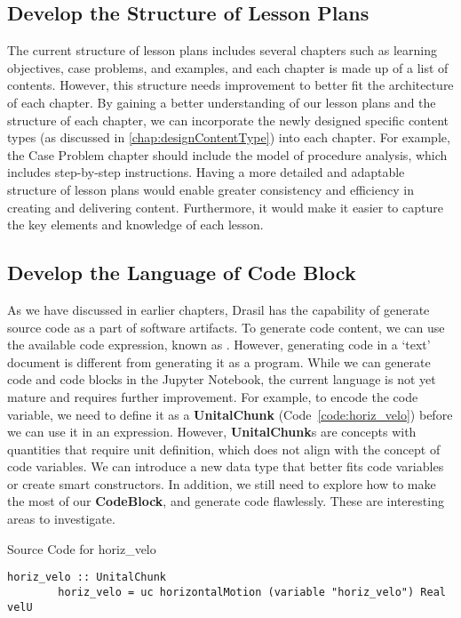 \subsection{Develop the Structure of Lesson Plans} 
\label{chap:developlsnPlanStruc}
The current structure of lesson plans includes several chapters such as 
learning objectives, case problems, and examples, and each chapter is made up 
of a list of contents. However, this structure needs improvement to better fit 
the architecture of each chapter. By gaining a better understanding of our 
lesson plans and the structure of each chapter, we can incorporate the newly 
designed specific content types (as discussed in \ref{chap:designContentType}) 
into each chapter. For example, the Case Problem chapter should include the 
model of procedure analysis, which includes step-by-step instructions. Having a 
more detailed and adaptable structure of lesson plans would enable greater 
consistency and efficiency in creating and delivering content. Furthermore, it 
would make it easier to capture the key elements and knowledge of each lesson.

\subsection{Develop the Language of Code Block}
As we have discussed in earlier chapters, Drasil has the capability of generate 
source code as a part of software artifacts. To generate code content, we can 
use the available code expression, known as . However, 
generating code in a `text' document is different from generating it as a 
program. While we can generate code and code blocks in the Jupyter Notebook, 
the current language is not yet mature and requires further improvement. For 
example, to encode the code variable, we need to define it as a 
\textbf{UnitalChunk} (Code~\ref{code:horiz_velo}) before we can use it in an 
expression. However, \textbf{UnitalChunk}s are concepts with quantities that 
require unit definition, which does not align with the concept of code 
variables. We can introduce a new data type that better fits code variables or 
create smart constructors. In addition, we still need to explore how to make 
the most of our \textbf{CodeBlock}, and generate code flawlessly. These are 
interesting areas to investigate.

\begin{listing}[h!]
	\caption{Source Code for horiz\_velo}
	\label{code:horiz_velo}
	\begin{lstlisting}[language=haskell1]
		horiz_velo :: UnitalChunk
		horiz_velo = uc horizontalMotion (variable "horiz_velo") Real velU 
	\end{lstlisting}
\end{listing}


